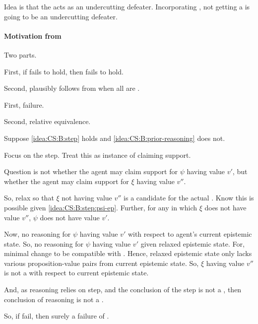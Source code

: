 \begin{note}
  \color{red}
  Idea is that the \epVAd{} \world{} acts as an undercutting defeater.
  Incorporating \ideaS{}, not getting a \sink{} is going to be an undercutting defeater.
\end{note}

\paragraph{Motivation from \ideaS{}}

\begin{note}
  Two parts.

  First, if \ideaCS{} fails to hold, then \ideaS{} fails to hold.

  Second, \ideaS{} plausibly follows from \ideaCS{} when all \epPAd{}  are \epVAd{}.
\end{note}

\begin{note}
  First, failure.
\end{note}

\begin{note}
  Second, relative equivalence.
\end{note}

\begin{note}
  Suppose \ref{idea:CS:B:step} holds and \ref{idea:CS:B:prior-reasoning} does not.


  Focus on the step.
  Treat this as instance of claiming support.

  Question is not whether the agent may claim support for \(\psi\) having value \(v'\), but whether the agent may claim support for \(\xi\) having value \(v''\).

  So, relax so that \(\xi\) not having value \(v''\) is a candidate for the actual \world{}.
  Know this is possible given \ref{idea:CS:B:step:psi-ep}.
  Further, for any \epVAd{} \world{} in which \(\xi\) does not have value \(v''\), \(\psi\) does not have value \(v'\).

  Now, no reasoning for \(\psi\) having value \(v'\) with respect to agent's current epistemic state.
  So, no reasoning for \(\psi\) having value \(v'\) given relaxed epistemic state.
  For, minimal change to be compatible with \epVAd{} \world{}.
  Hence, relaxed epistemic state only lacks various proposition-value pairs from current epistemic state.
  So, \(\xi\) having value \(v''\) is not a \sink{} with respect to current epistemic state.

  And, as reasoning relies on step, and the conclusion of the step is not a \sink{}, then conclusion of reasoning is not a \sink{}.

  So, if fail, then surely a failure of \ideaS{}.
\end{note}

